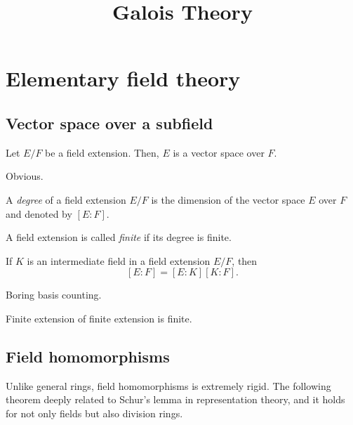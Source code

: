 \documentclass{../exp}
\title{Galois Theory}
\begin{document}
\maketitle
\tableofcontents








\section{Elementary field theory}




\subsection{Vector space over a subfield}

\begin{thm}
Let $E/F$ be a field extension.
Then, $E$ is a vector space over $F$.
\end{thm}
\begin{pf}
Obvious.
\end{pf}

\begin{defn}
A \emph{degree} of a field extension $E/F$ is the dimension of the vector space $E$ over $F$ and denoted by $[E:F]$.
\end{defn}

\begin{defn}
A field extension is called \emph{finite} if its degree is finite.
\end{defn}

\begin{thm}
If $K$ is an intermediate field in a field extension $E/F$, then
\[[E:F]=[E:K][K:F].\]
\end{thm}
\begin{pf}
Boring basis counting.
\end{pf}

\begin{cor}
Finite extension of finite extension is finite.
\end{cor}




\subsection{Field homomorphisms}

Unlike general rings, field homomorphisms is extremely rigid.
The following theorem deeply related to Schur's lemma in representation theory, and it holds for not only fields but also division rings.
\end{document}

